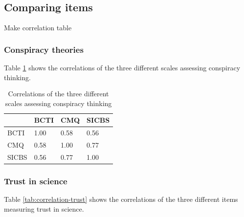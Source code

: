 \documentclass[
  doc,floatsintext]{apa6}
\begin{document}
\hypertarget{comparing-items}{%
\subsection{Comparing items}\label{comparing-items}}

Make correlation table

\hypertarget{conspiracy-theories}{%
\subsubsection{Conspiracy theories}\label{conspiracy-theories}}

Table \ref{tab:correlation-conspiracy} shows the correlations of the three different scales assessing conspiracy thinking.

\begin{table}[h]

\begin{center}
\begin{threeparttable}

\caption{\label{tab:correlation-conspiracy}Correlations of the three different scales assessing conspiracy thinking}

\begin{tabular}{llll}
\toprule
 & \multicolumn{1}{c}{BCTI} & \multicolumn{1}{c}{CMQ} & \multicolumn{1}{c}{SICBS}\\
\midrule
BCTI & 1.00 & 0.58 & 0.56\\
CMQ & 0.58 & 1.00 & 0.77\\
SICBS & 0.56 & 0.77 & 1.00\\
\bottomrule
\end{tabular}

\end{threeparttable}
\end{center}

\end{table}

\hypertarget{trust-in-science-2}{%
\subsubsection{Trust in science}\label{trust-in-science-2}}

Table \ref{tab:correlation-trust} shows the correlations of the three different items measuring trust in science.
\end{document}
